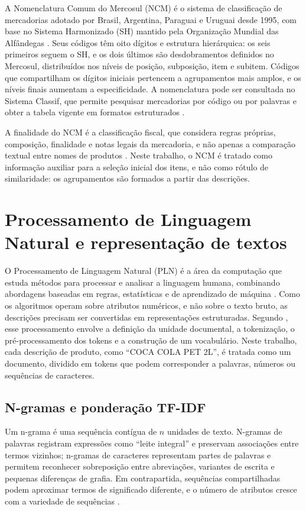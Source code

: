 \documentclass[english,brazilian]{UNISINOSmonografia}
\begin{document}
A Nomenclatura Comum do Mercosul (NCM) é o sistema de classificação de mercadorias adotado por Brasil, Argentina, Paraguai e Uruguai desde 1995, com base no Sistema Harmonizado (SH) mantido pela Organização Mundial das Alfândegas \cite{brasil2024ncm}. Seus códigos têm oito dígitos e estrutura hierárquica: os seis primeiros seguem o SH, e os dois últimos são desdobramentos definidos no Mercosul, distribuídos nos níveis de posição, subposição, item e subitem. Códigos que compartilham os dígitos iniciais pertencem a agrupamentos mais amplos, e os níveis finais aumentam a especificidade. A nomenclatura pode ser consultada no Sistema Classif, que permite pesquisar mercadorias por código ou por palavras e obter a tabela vigente em formatos estruturados \cite{brasil2025classif}.

A finalidade do NCM é a classificação fiscal, que considera regras próprias, composição, finalidade e notas legais da mercadoria, e não apenas a comparação textual entre nomes de produtos \cite{brasil2024ncm}. Neste trabalho, o NCM é tratado como informação auxiliar para a seleção inicial dos itens, e não como rótulo de similaridade: os agrupamentos são formados a partir das descrições.

\section{Processamento de Linguagem Natural e representação de textos}

O Processamento de Linguagem Natural (PLN) é a área da computação que estuda métodos para processar e analisar a linguagem humana, combinando abordagens baseadas em regras, estatísticas e de aprendizado de máquina \cite{jurafsky2025speech}. Como os algoritmos operam sobre atributos numéricos, e não sobre o texto bruto, as descrições precisam ser convertidas em representações estruturadas. Segundo , esse processamento envolve a definição da unidade documental, a tokenização, o pré-processamento dos tokens e a construção de um vocabulário. Neste trabalho, cada descrição de produto, como ``COCA COLA PET 2L'', é tratada como um documento, dividido em tokens que podem corresponder a palavras, números ou sequências de caracteres.

\subsection{N-gramas e ponderação TF-IDF}

Um n-grama é uma sequência contígua de $n$ unidades de texto. N-gramas de palavras registram expressões como ``leite integral'' e preservam associações entre termos vizinhos; n-gramas de caracteres representam partes de palavras e permitem reconhecer sobreposição entre abreviações, variantes de escrita e pequenas diferenças de grafia. Em contrapartida, sequências compartilhadas podem aproximar termos de significado diferente, e o número de atributos cresce com a variedade de sequências \cite{manning2008informationretrieval}.
\end{document}
